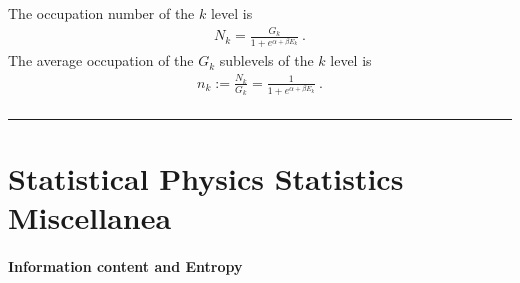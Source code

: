 \documentclass[letterpaper,10pt,english]{jupyterBook}
\begin{document}
\sphinxAtStartPar
The occupation number of the \(k\) level is
\begin{equation*}
\begin{split}N_k = \frac{G_k}{1 + e^{\alpha + \beta E_k}} \ .\end{split}
\end{equation*}
\sphinxAtStartPar
The average occupation of the \(G_k\) sublevels of the \(k\) level is
\begin{equation*}
\begin{split}n_k := \frac{N_k}{G_k} = \frac{1}{1 + e^{\alpha + \beta E_k}} \ .\end{split}
\end{equation*}\subsubsection*{}


\bigskip\hrule\bigskip


\sphinxstepscope


\chapter{Statistical Physics \sphinxhyphen{} Statistics Miscellanea}
\label{\detokenize{ch/statistical-mechanics/statistics:statistical-physics-statistics-miscellanea}}\label{\detokenize{ch/statistical-mechanics/statistics:statistical-mechanics-statistics}}\label{\detokenize{ch/statistical-mechanics/statistics::doc}}\subsubsection*{Information content and Entropy}
\end{document}
